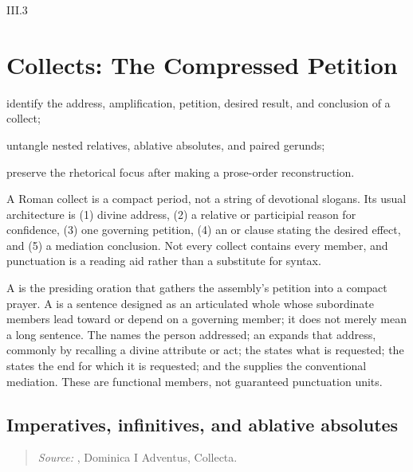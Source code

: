 \begin{courseunit}{III.3}
\chapter{Collects: The Compressed Petition}

\begin{learningobjectives}
  \item identify the address, amplification, petition, desired result, and conclusion of a collect;
  \item untangle nested relatives, ablative absolutes, and paired gerunds;
  \item preserve the rhetorical focus after making a prose-order reconstruction.
\end{learningobjectives}

A Roman collect is a compact period, not a string of devotional slogans. Its
usual architecture is (1) divine address, (2) a relative or participial reason
for confidence, (3) one governing petition, (4) an  or 
clause stating the desired effect, and (5) a mediation conclusion. Not every
collect contains every member, and punctuation is a reading aid rather than a
substitute for syntax.

A  is the presiding oration that gathers the assembly's petition
into a compact prayer. A  is a sentence designed as an articulated
whole whose subordinate members lead toward or depend on a governing member;
it does not merely mean a long sentence. The  names the person
addressed; an  expands that address, commonly by recalling
a divine attribute or act; the  states what is requested; the
 states the end for which it is requested; and the
 supplies the conventional mediation. These are functional
members, not guaranteed punctuation units.

\section{Imperatives, infinitives, and ablative absolutes}

\begin{quote}

\emph{Source:} \Missal, Dominica I Adventus, Collecta.
\end{quote}


\end{courseunit}
